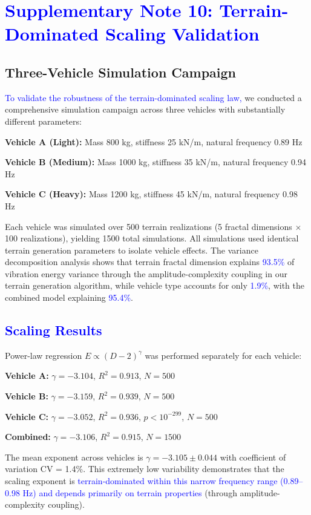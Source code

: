 \documentclass[11pt]{article}
\begin{document}
\section{\textcolor{blue}{Supplementary Note 10: Terrain-Dominated Scaling Validation}}

\subsection{Three-Vehicle Simulation Campaign}

\textcolor{blue}{To validate the robustness of the terrain-dominated scaling law,} we conducted a comprehensive simulation campaign across three vehicles with substantially different parameters:

\textbf{Vehicle A (Light):} Mass 800 kg, stiffness 25 kN/m, natural frequency 0.89 Hz

\textbf{Vehicle B (Medium):} Mass 1000 kg, stiffness 35 kN/m, natural frequency 0.94 Hz

\textbf{Vehicle C (Heavy):} Mass 1200 kg, stiffness 45 kN/m, natural frequency 0.98 Hz

Each vehicle was simulated over 500 terrain realizations (5 fractal dimensions $\times$ 100 realizations), yielding 1500 total simulations. All simulations used identical terrain generation parameters to isolate vehicle effects. The variance decomposition analysis shows that terrain fractal dimension explains \textcolor{blue}{93.5\%} of vibration energy variance through the amplitude-complexity coupling in our terrain generation algorithm, while vehicle type accounts for only \textcolor{blue}{1.9\%}, with the combined model explaining \textcolor{blue}{95.4\%}.

\subsection{\textcolor{blue}{Scaling Results}}

Power-law regression $E \propto (D-2)^\gamma$ was performed separately for each vehicle:

\textbf{Vehicle A:} $\gamma = -3.104$, $R^2 = 0.913$, $N = 500$

\textbf{Vehicle B:} $\gamma = -3.159$, $R^2 = 0.939$, $N = 500$

\textbf{Vehicle C:} $\gamma = -3.052$, $R^2 = 0.936$, $p < 10^{-299}$, $N = 500$

\textbf{Combined:} $\gamma = -3.106$, $R^2 = 0.915$, $N = 1500$

The mean exponent across vehicles is $\gamma = -3.105 \pm 0.044$ with coefficient of variation CV = 1.4\%. This extremely low variability demonstrates that the scaling exponent is \textcolor{blue}{terrain-dominated within this narrow frequency range (0.89--0.98 Hz) and depends primarily on terrain properties} (through amplitude-complexity coupling).
\end{document}
